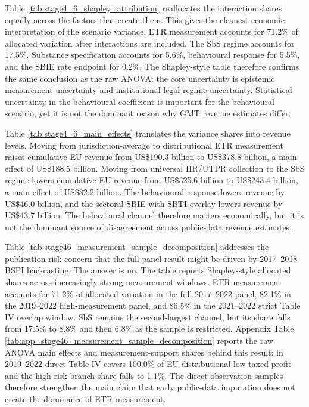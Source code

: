 \documentclass[11pt,a4paper]{article}
\begin{document}
Table \ref{tab:stage4_6_shapley_attribution} reallocates the interaction shares equally across the factors that create them. This gives the cleanest economic interpretation of the scenario variance. ETR measurement accounts for 71.2\% of allocated variation after interactions are included. The SbS regime accounts for 17.5\%. Substance specification accounts for 5.6\%, behavioural response for 5.5\%, and the SBIE rate endpoint for 0.2\%. The Shapley-style table therefore confirms the same conclusion as the raw ANOVA: the core uncertainty is epistemic measurement uncertainty and institutional legal-regime uncertainty. Statistical uncertainty in the behavioural coefficient is important for the behavioural scenario, yet it is not the dominant reason why GMT revenue estimates differ.



Table \ref{tab:stage4_6_main_effects} translates the variance shares into revenue levels. Moving from jurisdiction-average to distributional ETR measurement raises cumulative EU revenue from US\$190.3 billion to US\$378.8 billion, a main effect of US\$188.5 billion. Moving from universal IIR/UTPR collection to the SbS regime lowers cumulative EU revenue from US\$325.6 billion to US\$243.4 billion, a main effect of US\$82.2 billion. The behavioural response lowers revenue by US\$46.0 billion, and the sectoral SBIE with SBTI overlay lowers revenue by US\$43.7 billion. The behavioural channel therefore matters economically, but it is not the dominant source of disagreement across public-data revenue estimates.



Table \ref{tab:stage46_measurement_sample_decomposition} addresses the publication-risk concern that the full-panel result might be driven by 2017--2018 BSPI backcasting. The answer is no. The table reports Shapley-style allocated shares across increasingly strong measurement windows. ETR measurement accounts for 71.2\% of allocated variation in the full 2017--2022 panel, 82.1\% in the 2019--2022 high-measurement panel, and 86.5\% in the 2021--2022 strict Table IV overlap window. SbS remains the second-largest channel, but its share falls from 17.5\% to 8.8\% and then 6.8\% as the sample is restricted. Appendix Table \ref{tab:app_stage46_measurement_sample_decomposition} reports the raw ANOVA main effects and measurement-support shares behind this result: in 2019--2022 direct Table IV covers 100.0\% of EU distributional low-taxed profit and the high-risk branch share falls to 1.1\%. The direct-observation samples therefore strengthen the main claim that early public-data imputation does not create the dominance of ETR measurement.
\end{document}
